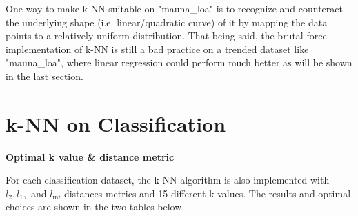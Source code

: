 \documentclass{article} %
\begin{document}
  One way to make k-NN suitable on "mauna\_loa" is to recognize and counteract the underlying shape (i.e. linear/quadratic curve) of it by mapping the data points to a relatively uniform distribution. That being said, the brutal force implementation of k-NN is still a bad practice on a trended dataset like "mauna\_loa", where linear regression could perform much better as will be shown in the last section.



\vspace{0.4cm}
\section*{k-NN on Classification} %

\textbf{Optimal k value \& distance metric}

  For each classification dataset, the k-NN algorithm is also implemented with $l_2, l_1,$ and $l_{\inf}$ distances metrics and 15 different k values. The results and optimal choices are shown in the two tables below.
\end{document}
